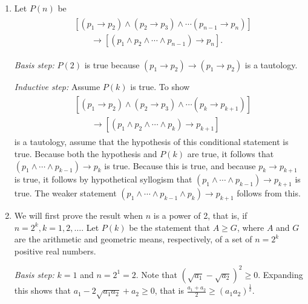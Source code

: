 \documentclass{../../cls/sig-alternate-05-2015}
\begin{document}
\begin{enumerate}
\item Let $P(n)$ be \begin{align}
\begin{aligned}
& [(p_1 \rightarrow p_2) \land (p_2 \rightarrow p_3) \land \cdots (p_{n - 1} \rightarrow p_{n})]\\
& \qquad \rightarrow [(p_1 \land p_2 \land \cdots \land p_{n - 1}) \rightarrow p_{n}].
\end{aligned}
\end{align}

\textit{Basis step:} $P(2)$ is true because $(p_1 \rightarrow p_2) \rightarrow (p_1 \rightarrow p_2)$ is a tautology.

\textit{Inductive step:} Assume $P(k)$ is true.
To show \begin{align}
\begin{aligned}
& [(p_1 \rightarrow p_2) \land (p_2 \rightarrow p_3) \land \cdots (p_{k} \rightarrow p_{k + 1})]\\
& \qquad \rightarrow [(p_1 \land p_2 \land \cdots \land p_{k}) \rightarrow p_{k + 1}]
\end{aligned}
\end{align} is a tautology,
assume that the hypothesis of this conditional statement is true.
Because both the hypothesis and $P(k)$ are true,
it follows that $(p_1 \land \cdots \land p_{k - 1}) \rightarrow p_k$ is true.
Because this is true, and because $p_k \rightarrow p_{k + 1}$ is true,
it follows by hypothetical syllogism that $(p_1 \land \cdots \land p_{k - 1}) \rightarrow p_{k + 1}$ is true.
The weaker statement $(p_1 \land \cdots \land p_{k - 1} \land p_k) \rightarrow p_{k + 1}$ follows from this.

\item We will first prove the result when $n$ is a power of 2,
that is, if $n = 2^k, k = 1, 2, \ldots$.
Let $P(k)$ be the statement that $A \ge G$,
where $A$ and $G$ are the arithmetic and geometric means,
respectively, of a set of $n = 2^k$ positive real numbers.

\textit{Basis step:} $k = 1$ and $n = 2^1 = 2$.
Note that $(\sqrt{a_1} - \sqrt{a_2})^2 \ge 0$.
Expanding this shows that $a_1 - 2 \sqrt{a_1 a_2} + a_2 \ge 0$,
that is $\frac{a_1 + a_2}{2} \ge (a_1 a_2)^\frac{1}{2}$.


\end{enumerate}
\end{document}
